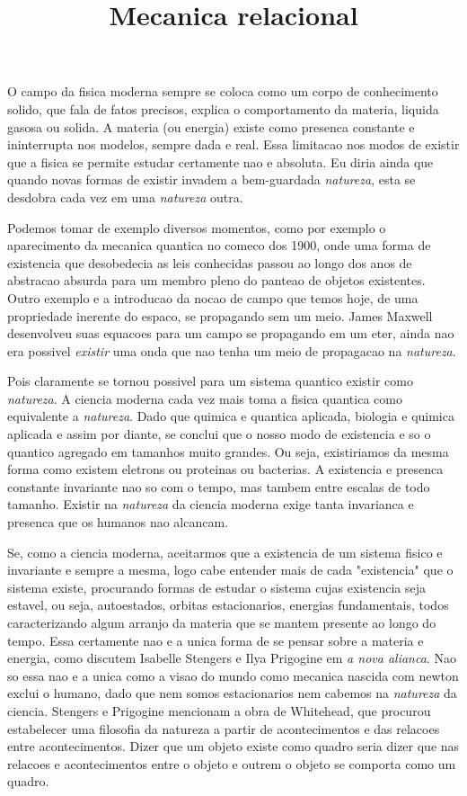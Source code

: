 \documentclass{article}
\begin{document}
\title{Mecanica relacional}
\maketitle

O campo da fisica moderna sempre se coloca como um corpo de conhecimento solido,
que fala de fatos precisos, explica o comportamento da materia, liquida gasosa
ou solida. A materia (ou energia) existe como presenca constante e ininterrupta
nos modelos, sempre dada e real. Essa limitacao nos modos de existir que a fisica
se permite estudar certamente nao e absoluta. Eu diria ainda que quando
novas formas de existir invadem a bem-guardada \emph{natureza}, esta se
desdobra cada vez em uma \emph{natureza} outra.

Podemos tomar de exemplo diversos momentos, como por exemplo o aparecimento da
mecanica quantica no comeco dos 1900, onde uma forma de existencia que
desobedecia as leis conhecidas passou ao longo dos anos de abstracao absurda
para um membro pleno do panteao de objetos existentes. Outro exemplo e a
introducao da nocao de campo que temos hoje, de uma propriedade inerente do
espaco, se propagando sem um meio. James Maxwell desenvolveu suas equacoes
para um campo se propagando em um eter, ainda nao era possivel \emph{existir}
uma onda que nao tenha um meio de propagacao na \emph{natureza}.

Pois claramente se tornou possivel para um sistema quantico existir como
\emph{natureza}. A ciencia moderna cada vez mais toma a fisica
quantica como equivalente a \emph{natureza}. Dado que quimica e quantica
aplicada, biologia e quimica aplicada e assim por diante, se conclui que o nosso
modo de existencia e so o quantico agregado em tamanhos muito grandes. Ou seja,
existiriamos da mesma forma como existem eletrons ou proteinas ou bacterias. A
existencia e presenca constante invariante nao so com o tempo, mas tambem entre
escalas de todo tamanho. Existir na \emph{natureza} da ciencia moderna exige
tanta invarianca e presenca que os humanos nao alcancam.

Se, como a ciencia moderna, aceitarmos que a existencia de um sistema fisico e
invariante e sempre a mesma, logo cabe entender mais de cada "existencia" que o
sistema existe, procurando formas de estudar o sistema cujas existencia seja
estavel, ou seja, autoestados, orbitas estacionarios, energias
fundamentais, todos caracterizando algum arranjo da materia que se mantem
presente ao longo do tempo. Essa certamente nao e a unica forma de se pensar
sobre a materia e
energia, como discutem Isabelle Stengers e Ilya Prigogine em \emph{a nova
alianca}. Nao so essa nao e a unica como a visao do mundo como mecanica nascida
com newton exclui o humano, dado que nem somos estacionarios nem cabemos na
\emph{natureza} da ciencia. Stengers e Prigogine mencionam a obra de Whitehead,
que procurou estabelecer uma filosofia da natureza a partir de acontecimentos e
das relacoes entre acontecimentos. Dizer que um objeto existe como quadro seria
dizer que nas relacoes e acontecimentos entre o objeto e outrem o objeto se
comporta como um quadro.
\end{document}
